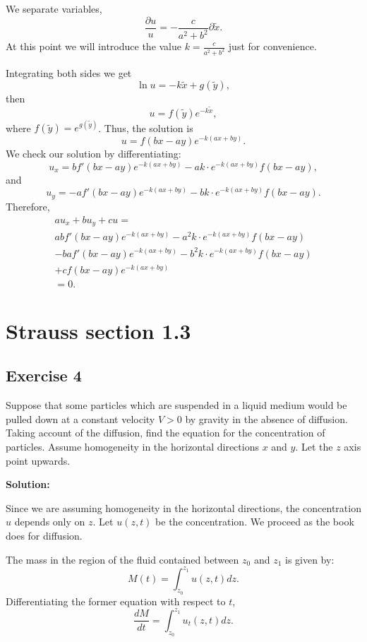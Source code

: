 \documentclass{article}
\begin{document}
		We separate variables, \[\frac{\partial u}{u}=-\frac{c}{a^2+b^2}\partial \tilde{x}.\]
		At this point we will introduce the value $k=\frac{c}{a^2+b^2}$ just for convenience.

		Integrating both sides we get
		\[
			\ln u = -k\tilde{x} +g(\tilde{y}),
		\]
		then
		\[
		u = f(\tilde{y})e^{-k\tilde{x}},
		\]
		where $f(\tilde{y})=e^{g(\tilde{y})}$.
		Thus, the solution is
		\[
		u = f(bx-ay)e^{-k(ax+by)}.
		\]
		We check our solution by differentiating:
		\[
		u_x= b f'(bx-ay)e^{-k(ax+by)} -ak \cdot e^{-k(ax+by)}f(bx-ay),
		\]
		and
		\[
		u_y= -a f'(bx-ay)e^{-k(ax+by)} -bk \cdot e^{-k(ax+by)}f(bx-ay).
		\]	
		Therefore,
			\begin{multline*}
				au_x+bu_y+cu= \\
				ab f'(bx-ay)e^{-k(ax+by)} -a^2k \cdot e^{-k(ax+by)}f(bx-ay)\\
				-ba f'(bx-ay)e^{-k(ax+by)}-b^2k \cdot e^{-k(ax+by)}f(bx-ay) \\
				+cf(bx-ay)e^{-k(ax+by)} \\
				=0.
			\end{multline*}

\section{Strauss section 1.3}
\subsection{Exercise 4}
		Suppose that some particles which are
			suspended in a liquid medium would be pulled down
			at a constant velocity $V > 0$ by gravity in the
			absence of diffusion. Taking account of the
			diffusion, find the equation for the concentration
			of particles. Assume homogeneity in the horizontal
			directions $x$ and $y$. Let the $z$ axis point upwards.

			\textbf{Solution:}

			Since we are assuming homogeneity in the horizontal
			directions, the concentration $u$ depends only on $z$.
			Let $u(z,t)$ be the concentration. We proceed as the
			book does for diffusion.

			The mass in the region of the fluid contained between
			$z_0$ and $z_1$ is given by:
            \begin{equation*}
				M(t) = \int_{z_0}^{z_1} u(z,t)dz.
			\end{equation*}
			Differentiating the former equation with respect to $t$,
			\begin{equation}\label{change_of_mass}
				\frac{dM}{dt}=\int_{z_0}^{z_1}u_t(z,t)dz.
			\end{equation}
\end{document}
